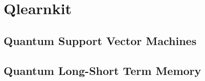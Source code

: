 \graphicspath{{assets/qlearnkit/}}

\section{Qlearnkit}


\subsection{Quantum Support Vector Machines}

\subsection{Quantum Long-Short Term Memory}